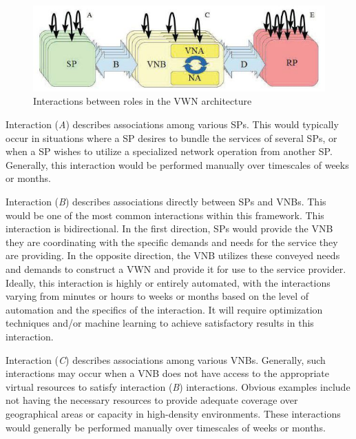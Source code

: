 \documentclass[12pt,dvipsnames]{report}
\begin{document}
\begin{figure}[ht]
	\centering
	\includegraphics[width=1\linewidth]{VWNArchitectureInteractions}
	\caption[Interactions between roles in the VWN architecture]{Interactions between roles in the VWN architecture~\cite{MJ_MECOMM_17}}
	\label{fig:VWNArchitectureInteractions}
\end{figure}

Interaction (\emph{A}) describes associations among various SPs.  This would typically occur in situations where a SP desires to bundle the services of several SPs, or when a SP wishes to utilize a specialized network operation from another SP.  Generally, this interaction would be performed manually over timescales of weeks or months.

Interaction (\emph{B}) describes associations directly between SPs and VNBs.  This would be one of the most common interactions within this framework.  This interaction is bidirectional.  In  the first direction, SPs would provide the VNB they are coordinating with the specific demands and needs for the service they are providing.  In the opposite direction, the VNB utilizes these conveyed needs and demands to construct a VWN and provide it for use to the service provider.  Ideally, this interaction is highly or entirely automated, with the interactions varying from minutes or hours to weeks or months based on the level of automation and the specifics of the interaction.  It will require optimization techniques and/or machine learning to achieve satisfactory results in this interaction.

Interaction (\emph{C}) describes associations among various VNBs.  Generally, such interactions may occur when a VNB does not have access to the appropriate virtual resources to satisfy interaction (\emph{B}) interactions.  Obvious examples include not having the necessary resources to provide adequate coverage over geographical areas or capacity in high-density environments.  These interactions would generally be performed manually over timescales of weeks or months.
\end{document}
